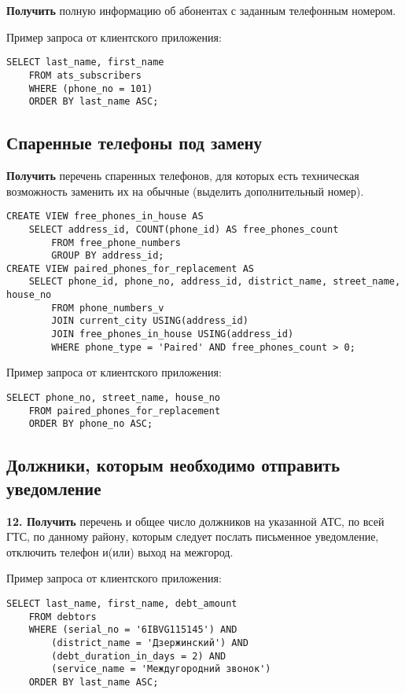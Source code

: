 \documentclass{report}
\begin{document}
\textbf{Получить} полную информацию об абонентах с заданным телефонным номером.

Пример запроса от клиентского приложения:

\begin{lstlisting}
SELECT last_name, first_name
	FROM ats_subscribers
	WHERE (phone_no = 101)
	ORDER BY last_name ASC;
\end{lstlisting}

\subsection{Спаренные телефоны под замену}

\textbf{Получить} перечень спаренных телефонов, для которых есть 
техническая возможность заменить их на обычные (выделить дополнительный номер).

\begin{lstlisting}
CREATE VIEW free_phones_in_house AS 
    SELECT address_id, COUNT(phone_id) AS free_phones_count
        FROM free_phone_numbers
        GROUP BY address_id;
CREATE VIEW paired_phones_for_replacement AS 
    SELECT phone_id, phone_no, address_id, district_name, street_name, house_no
        FROM phone_numbers_v
        JOIN current_city USING(address_id)
        JOIN free_phones_in_house USING(address_id)
        WHERE phone_type = 'Paired' AND free_phones_count > 0;
\end{lstlisting}

Пример запроса от клиентского приложения:

\begin{lstlisting}
SELECT phone_no, street_name, house_no
	FROM paired_phones_for_replacement
	ORDER BY phone_no ASC;
\end{lstlisting}

\subsection{Должники, которым необходимо отправить уведомление}

\textbf{12. Получить} перечень и общее число должников на указанной АТС, 
по всей ГТС, по данному району, которым следует послать письменное уведомление, 
отключить телефон и(или) выход на межгород.

Пример запроса от клиентского приложения:

\begin{lstlisting}
SELECT last_name, first_name, debt_amount
	FROM debtors
	WHERE (serial_no = '6IBVG115145') AND
		(district_name = 'Дзержинский') AND
		(debt_duration_in_days = 2) AND
		(service_name = 'Междугородний звонок')
	ORDER BY last_name ASC;
\end{lstlisting}
\end{document}
